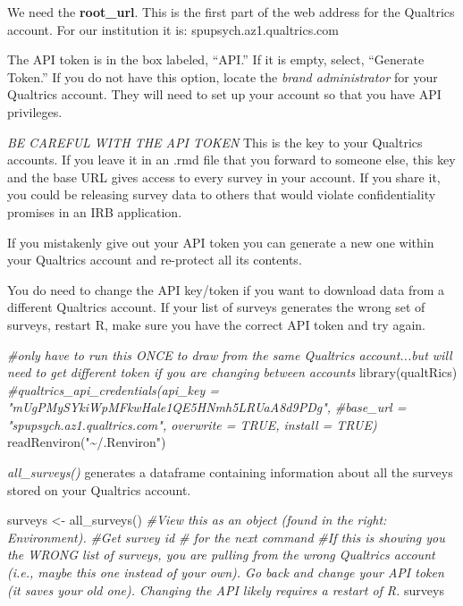 \documentclass[
  11pt,
]{book}
\newenvironment{Shaded}{\begin{snugshade}}{\end{snugshade}}
\newcommand{\CommentTok}[1]{\textcolor[rgb]{0.56,0.35,0.01}{\textit{#1}}}
\newcommand{\FunctionTok}[1]{\textcolor[rgb]{0.00,0.00,0.00}{#1}}
\newcommand{\NormalTok}[1]{#1}
\newcommand{\OtherTok}[1]{\textcolor[rgb]{0.56,0.35,0.01}{#1}}
\newcommand{\StringTok}[1]{\textcolor[rgb]{0.31,0.60,0.02}{#1}}
\begin{document}
We need the \textbf{root\_url}. This is the first part of the web address for the Qualtrics account. For our institution it is: spupsych.az1.qualtrics.com

The API token is in the box labeled, ``API.'' If it is empty, select, ``Generate Token.'' If you do not have this option, locate the \emph{brand administrator} for your Qualtrics account. They will need to set up your account so that you have API privileges.

\emph{BE CAREFUL WITH THE API TOKEN} This is the key to your Qualtrics accounts. If you leave it in an .rmd file that you forward to someone else, this key and the base URL gives access to every survey in your account. If you share it, you could be releasing survey data to others that would violate confidentiality promises in an IRB application.

If you mistakenly give out your API token you can generate a new one within your Qualtrics account and re-protect all its contents.

You do need to change the API key/token if you want to download data from a different Qualtrics account. If your list of surveys generates the wrong set of surveys, restart R, make sure you have the correct API token and try again.

\begin{Shaded}
\begin{Highlighting}[]
\CommentTok{\#only have to run this ONCE to draw from the same Qualtrics account...but will need to get different token if you are changing between accounts }
\FunctionTok{library}\NormalTok{(qualtRics)}
\CommentTok{\#qualtrics\_api\_credentials(api\_key = "mUgPMySYkiWpMFkwHale1QE5HNmh5LRUaA8d9PDg",}
              \CommentTok{\#base\_url = "spupsych.az1.qualtrics.com", overwrite = TRUE, install = TRUE)}
\FunctionTok{readRenviron}\NormalTok{(}\StringTok{"\textasciitilde{}/.Renviron"}\NormalTok{)}
\end{Highlighting}
\end{Shaded}

\emph{all\_surveys()} generates a dataframe containing information about all the surveys stored on your Qualtrics account.

\begin{Shaded}
\begin{Highlighting}[]
\NormalTok{surveys }\OtherTok{\textless{}{-}} \FunctionTok{all\_surveys}\NormalTok{() }
\CommentTok{\#View this as an object (found in the right: Environment).  }
\CommentTok{\#Get survey id \# for the next command}
\CommentTok{\#If this is showing you the WRONG list of surveys, you are pulling from the wrong Qualtrics account (i.e., maybe this one instead of your own). Go back and change your API token (it saves your old one). Changing the API likely requires a restart of R.}
\NormalTok{surveys}
\end{Highlighting}
\end{Shaded}
\end{document}

